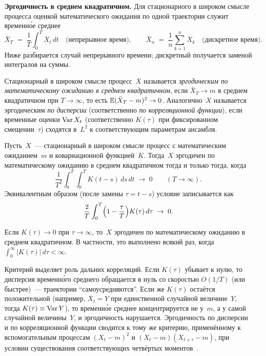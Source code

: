 \medskip
\noindent\textbf{Эргодичность в среднем квадратичном.} Для стационарного в широком смысле процесса оценкой математического ожидания по одной траектории служит временн\'{о}е среднее
\[
  \bar X_T \;=\; \frac{1}{T} \int_0^{T} X_t\, dt \quad \text{(непрерывное время)}, \qquad
  \bar X_n \;=\; \frac{1}{n} \sum_{k=1}^{n} X_k \quad \text{(дискретное время)}.
\]
Ниже разбирается случай непрерывного времени; дискретный получается заменой интегралов на суммы.

\begin{definition}
\label{def:ms-ergodic}
Стационарный в широком смысле процесс~$X$ называется \emph{эргодическим по математическому ожиданию в среднем квадратичном}, если $\bar X_T \to m$ в среднем квадратичном при $T \to \infty$, то есть $\mathbb{E} (\bar X_T - m)^2 \to 0$. Аналогично~$X$ называется эргодическим \emph{по дисперсии} (соответственно \emph{по корреляционной функции}), если временные оценки $\operatorname{Var} X_t$ (соответственно $K(\tau)$ при фиксированном смещении~$\tau$) сходятся в~$L^2$ к соответствующим параметрам ансамбля.
\end{definition}

\begin{theorem}
\label{thm:ms-ergodic-criterion}
Пусть~$X$~--- стационарный в широком смысле процесс с математическим ожиданием~$m$ и ковариационной функцией~$K$. Тогда~$X$ эргодичен по математическому ожиданию в среднем квадратичном тогда и только тогда, когда
\[
  \frac{1}{T^2} \int_0^{T} \int_0^{T} K(t - s)\, ds\, dt \;\to\; 0 \qquad (T \to \infty).
\]
Эквивалентным образом (после замены $\tau = t - s$) условие записывается как
\[
  \frac{2}{T} \int_0^{T} \Bigl(1 - \frac{\tau}{T}\Bigr) K(\tau)\, d\tau \;\to\; 0.
\]
\end{theorem}

\begin{corollary}
\label{cor:ms-ergodic-sufficient}
Если $K(\tau) \to 0$ при $\tau \to \infty$, то~$X$ эргодичен по математическому ожиданию в среднем квадратичном. В частности, это выполнено всякий раз, когда $\int_0^{\infty} |K(\tau)|\, d\tau < \infty$.
\end{corollary}

\begin{remark}
Критерий выделяет роль дальних корреляций. Если $K(\tau)$ убывает к нулю, то дисперсия временн\'{о}го среднего обращается в нуль со скоростью $O(1/T)$ (или быстрее)~--- траектории ``самоусредняются''. Если же $K(\tau)$ остаётся положительной (например, $X_t = Y$ при единственной случайной величине~$Y$, тогда $K(\tau) \equiv \operatorname{Var} Y$), то временн\'{о}е среднее концентрируется не у~$m$, а у самой случайной величины~$Y$, и эргодичность нарушается. Эргодичность по дисперсии и по корреляционной функции сводится к тому же критерию, применённому к вспомогательным процессам $(X_t - m)^2$ и $(X_t - m)(X_{t + \tau} - m)$, при условии существования соответствующих четвёртых моментов~\cite[гл.~VI, \S~5]{Sevastyanov1982}.
\end{remark}

